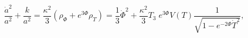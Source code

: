 \begin{equation} \label{einstein1}
\frac{\dot a^2}{a^2}+\frac{k}{a^2}
=\frac{\kappa^{2}}{3}(\rho_{\Phi}+e^{3\Phi}\rho_{T})
= \frac{1}{3}\dot\Phi^2
+\frac{\kappa^2}{3}T_3\;e^{3\Phi}V(T)\frac{1}{\sqrt{1-e^{-2\Phi}\dot T^2}},
\end{equation}

